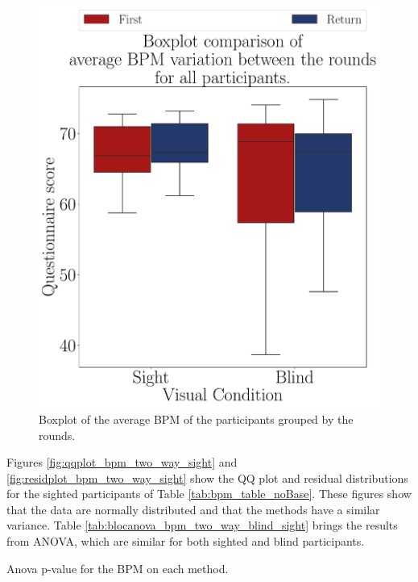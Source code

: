 \begin{figure}[!htb]
\begin{minipage}{0.45\textwidth}
        \includegraphics[width = \textwidth]{Resultados/ECG/Figuras/pdf/boxplot_ecg_bpm_4_rounds.pdf}
        \caption{Boxplot of the average BPM of the participants grouped by the rounds.}
        \label{fig:boxplot_ecg_bpm_4_rounds}
    \end{minipage}
\end{figure}
 
%
%

Figures \ref{fig:qqplot_bpm_two_way_sight} and \ref{fig:residplot_bpm_two_way_sight} show the QQ plot and residual distributions for the sighted participants of Table \ref{tab:bpm_table_noBase}. These figures show that the data are normally distributed and that the methods have a similar variance. Table \ref{tab:blocanova_bpm_two_way_blind_sight} brings the results from ANOVA, which are similar for both sighted and blind participants.


\begin{table}[!htb]
    \caption{Anova p-value for the BPM on each method.}
    \label{tab:blocanova_bpm_two_way_blind_sight}
\begin{minipage}{0.45\textwidth}
    
\end{minipage}
\begin{minipage}{0.45\textwidth}
    
\end{minipage}
\end{table}


